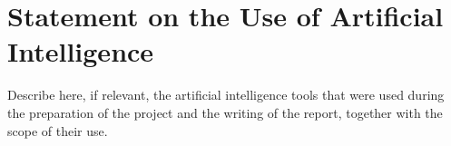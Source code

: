 \chapter*{Statement on the Use of Artificial Intelligence}

Describe here, if relevant, the artificial intelligence tools that were used
during the preparation of the project and the writing of the report, together
with the scope of their use.
